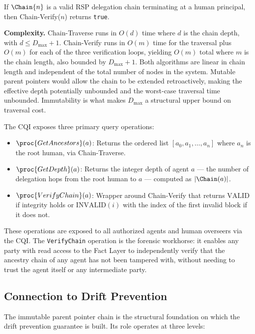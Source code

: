 \begin{prop}
\label{prop:chain_verify_completeness}
If $\Chain{n}$ is a valid RSP delegation chain terminating at a human principal, then Chain-Verify($n$) returns \texttt{true}.
\end{prop}

\textbf{Complexity.} Chain-Traverse runs in $O(d)$ time where $d$ is the chain depth, with $d \leq D_{\max} + 1$. Chain-Verify runs in $O(m)$ time for the traversal plus $O(m)$ for each of the three verification loops, yielding $O(m)$ total where $m$ is the chain length, also bounded by $D_{\max} + 1$. Both algorithms are linear in chain length and independent of the total number of nodes in the system. Mutable parent pointers would allow the chain to be extended retroactively, making the effective depth potentially unbounded and the worst-case traversal time unbounded. Immutability is what makes $D_{\max}$ a structural upper bound on traversal cost.

The CQI exposes three primary query operations:
\begin{itemize}
    \item $\proc{GetAncestors}(a)$: Returns the ordered list $[a_0, a_1, \ldots, a_n]$ where $a_n$ is the root human, via Chain-Traverse.
    \item $\proc{GetDepth}(a)$: Returns the integer depth of agent $a$ --- the number of delegation hops from the root human to $a$ --- computed as $|\Chain(a)|$.
    \item $\proc{VerifyChain}(a)$: Wrapper around Chain-Verify that returns $\mathrm{VALID}$ if integrity holds or $\mathrm{INVALID}(i)$ with the index of the first invalid block if it does not.
\end{itemize}

These operations are exposed to all authorized agents and human overseers via the CQI. The \texttt{VerifyChain} operation is the forensic workhorse: it enables any party with read access to the Fact Layer to independently verify that the ancestry chain of any agent has not been tampered with, without needing to trust the agent itself or any intermediate party.

\subsection{Connection to Drift Prevention}

The immutable parent pointer chain is the structural foundation on which the drift prevention guarantee is built. Its role operates at three levels:

